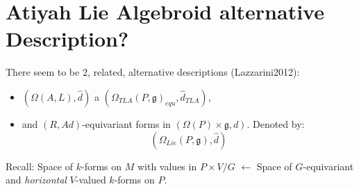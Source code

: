 \section{Atiyah Lie Algebroid alternative Description?}

There seem to be $2$, related, alternative descriptions (Lazzarini2012):
    
    \begin{itemize}
        
    \item $(\Omega(A, L), \hat d)$ a $(\Omega_{TLA}(P, \mathfrak g)_{equ}, \hat d_{TLA})$,
    
    \item and $(R, Ad)$-equivariant forms in $(\Omega(P) \times \mathfrak g, d)$. Denoted by: \[ (\Omega_{Lie}(P, \mathfrak g), \hat d) \]
        
    \end{itemize}

Recall: Space of $k$-forms on $M$ with values in $P \times V/G$ $\longleftarrow$ Space of $G$-equivariant and \emph{horizontal} $V$-valued $k$-forms on $P$.

